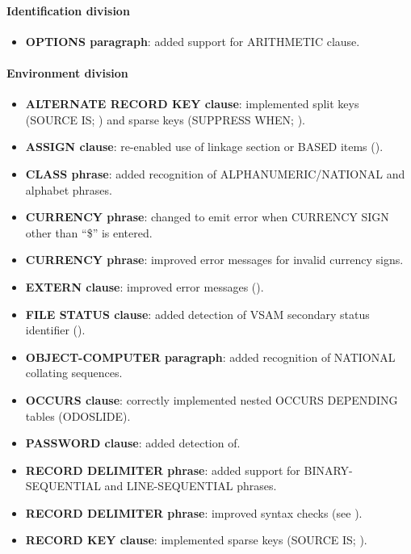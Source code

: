 \paragraph{Identification division}
\begin{itemize}
\item \textbf{OPTIONS paragraph}: added support for ARITHMETIC clause.
\end{itemize}

\paragraph{Environment division}
\begin{itemize}
\item \textbf{ALTERNATE RECORD KEY clause}: implemented split keys (SOURCE IS; ) and sparse keys (SUPPRESS WHEN; ).
\item \textbf{ASSIGN clause}: re-enabled use of linkage section or BASED items ().
\item \textbf{CLASS phrase}: added recognition of ALPHANUMERIC\slash{}NATIONAL and alphabet phrases.
\item \textbf{CURRENCY phrase}: changed to emit error when CURRENCY SIGN other than ``\$'' is entered.
\item \textbf{CURRENCY phrase}: improved error messages for invalid currency signs.
\item \textbf{EXTERN clause}: improved error messages ().
\item \textbf{FILE STATUS clause}: added detection of VSAM secondary status identifier ().
\item \textbf{OBJECT-COMPUTER paragraph}: added recognition of NATIONAL collating sequences.
\item \textbf{OCCURS clause}: correctly implemented nested OCCURS DEPENDING tables (ODOSLIDE).
\item \textbf{PASSWORD clause}: added detection of.
\item \textbf{RECORD DELIMITER phrase}:  added support for BINARY-SEQUENTIAL and LINE-SEQUENTIAL phrases.
\item \textbf{RECORD DELIMITER phrase}: improved syntax checks (see ).
\item \textbf{RECORD KEY clause}: implemented sparse keys (SOURCE IS; ).
\end{itemize}

